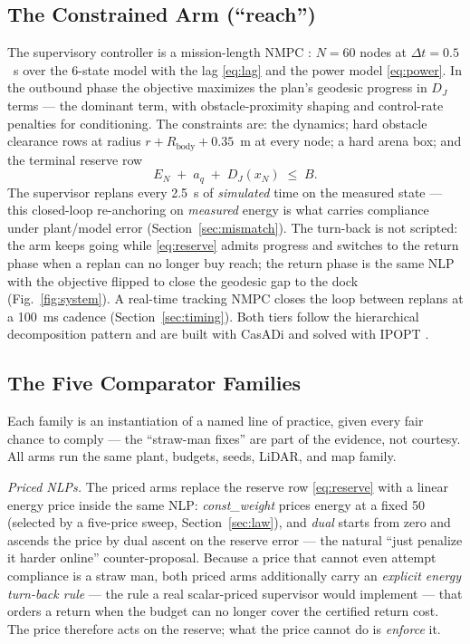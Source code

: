 \documentclass[preprint,12pt]{elsarticle}
\begin{document}
\subsection{The Constrained Arm (``reach'')}
The supervisory controller is a mission-length NMPC
\cite{rawlings2017mpc}: $N = 60$ nodes
at $\Delta t = 0.5$~s over the 6-state model with the lag
\eqref{eq:lag} and the power model \eqref{eq:power}. In the outbound
phase the objective maximizes the plan's geodesic progress in
$D_J$ terms --- the dominant term, with obstacle-proximity shaping
and control-rate penalties for conditioning. The constraints are: the
dynamics;
hard obstacle clearance rows at radius $r + R_{\mathrm{body}} + 0.35$~m
at every node; a hard arena box; and the terminal reserve row
\begin{equation}
E_N \;+\; a_q \;+\; D_J(x_N) \;\le\; B .
\label{eq:reserve}
\end{equation}
The supervisor replans every 2.5~s of \emph{simulated} time on the
measured state --- this closed-loop re-anchoring on \emph{measured}
energy is what carries compliance under plant/model error
(Section~\ref{sec:mismatch}). The turn-back is not scripted: the arm
keeps going while \eqref{eq:reserve} admits progress and switches to
the return phase when a replan can no longer buy reach; the return
phase is the same NLP with the objective flipped to close the
geodesic gap to the dock (Fig.~\ref{fig:system}). A real-time
tracking NMPC
closes the loop between replans at a 100~ms cadence
(Section~\ref{sec:timing}). Both tiers follow the hierarchical
decomposition pattern \cite{scattolini2009architectures} and are
built with CasADi
\cite{andersson2019casadi} and solved with IPOPT
\cite{waechter2006ipopt}.

\subsection{The Five Comparator Families}
Each family is an instantiation of a named line of practice, given
every fair chance to comply --- the ``straw-man fixes'' are part of
the evidence, not courtesy. All arms run the same plant, budgets,
seeds, LiDAR, and map family.

\emph{Priced NLPs.} The priced arms replace the reserve row
\eqref{eq:reserve} with a linear energy price inside the same NLP:
\emph{const\_weight} prices energy at a fixed 50 (selected by a
five-price sweep, Section~\ref{sec:law}), and \emph{dual}
starts from zero and ascends the price by dual ascent on the
reserve error --- the natural ``just penalize it harder online''
counter-proposal. Because a
price that cannot even attempt compliance is a straw man, both priced
arms additionally carry an \emph{explicit energy turn-back rule} ---
the rule a real scalar-priced supervisor would implement --- that
orders a return when the budget can no longer cover the certified
return cost. The price therefore acts on the reserve; what the price
cannot do is \emph{enforce} it.
\end{document}
